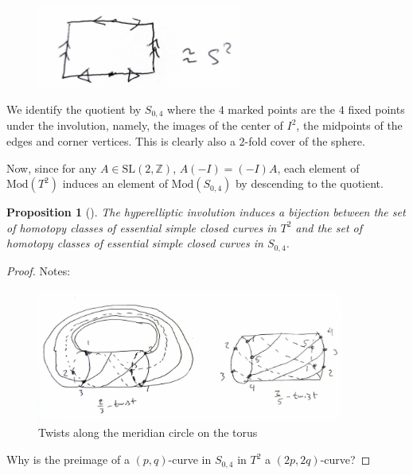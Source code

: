 \documentclass[reqno]{amsart}
\newtheorem{proposition}[theorem]{Proposition}
\theoremstyle{definition}
\theoremstyle{remark}
\newcommand{\SL}{{\mathrm{SL}}}
\newcommand{\Mod}{{\mathrm{Mod}}}
\begin{document}
\begin{figure}[htpb]
    \centering
    \includegraphics[width=0.6\textwidth]{involution-on-torus-quotient.jpg}
    \caption{}
    \label{fig:involution-on-torus-quotient}
\end{figure}

We identify the quotient
by $S_{0,4}$ where the $4$ marked points are
the $4$ fixed points under the involution, namely, the images
of the
center of $I^2$, the midpoints of the edges and corner vertices.
This is clearly also a $2$-fold cover of the sphere.

Now, since for any $A \in \SL (2,\mathbb{Z})$,
$A (-I) = (-I) A$,
each element of $\Mod \left( T^2 \right) $ induces
an element of $\Mod \left( S_{0,4} \right) $ by
descending to the quotient.


\begin{proposition}[]
    The hyperelliptic involution induces a bijection
    between the set of homotopy classes of essential
    simple closed curves in $T^2$ and the
    set of homotopy classes of essential simple closed 
    curves in $S_{0,4}$.
\end{proposition}

\begin{proof}
    Notes:

    \begin{figure}[htpb]
        \centering
        \includegraphics[width=0.9\textwidth]{twists-along-curves-on-torus.jpg}
        \caption{Twists along the meridian circle on the torus}
        \label{fig:twists-along-curves-on-torus-jpg}
    \end{figure}


    Why is the preimage of a $\left( p,q \right) $-curve in
    $S_{0,4}$ in $T^2$ a $\left( 2p,2q \right) $-curve?

\end{proof}
\end{document}
